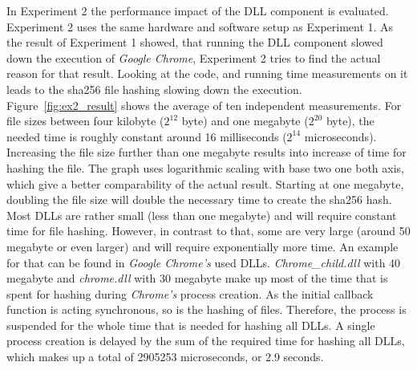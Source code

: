 In Experiment 2 the performance impact of the \gls{DLL} component is evaluated. Experiment 2 uses the same hardware and software setup as Experiment 1. As the result of Experiment 1 showed, that running the \gls{DLL} component slowed down the execution of \emph{Google Chrome}, Experiment 2 tries to find the actual reason for that result. Looking at the code, and running time measurements on it leads to the sha256 file hashing slowing down the execution. Figure~\ref{fig:ex2_result} shows the average of ten independent measurements. For file sizes between four kilobyte ($2^{12}$ byte) and one megabyte ($2^{20}$ byte), the needed time is roughly constant around 16 milliseconds ($2^{14}$ microseconds). Increasing the file size further than one megabyte results into increase of time for hashing the file. The graph uses logarithmic scaling with base two one both axis, which give a better comparability of the actual result. Starting at one megabyte, doubling the file size will double the necessary time to create the sha256 hash. Most \glspl{DLL} are rather small (less than one megabyte) and will require constant time for file hashing. However, in contrast to that, some are very large (around 50 megabyte or even larger) and will require exponentially more time. An example for that can be found in \emph{Google Chrome's} used \glspl{DLL}. \emph{Chrome\_child.dll} with 40 megabyte and \emph{chrome.dll} with 30 megabyte make up most of the time that is spent for hashing during \emph{Chrome's} process creation. As the initial callback function  is acting synchronous, so is the hashing of files. Therefore, the process is suspended for the whole time that is needed for hashing all \glspl{DLL}. A single process creation is delayed by the sum of the required time for hashing all \glspl{DLL}, which makes up a total of 2905253 microseconds, or 2.9 seconds.

